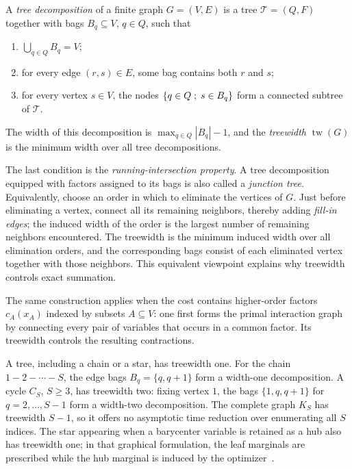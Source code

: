 \begin{defn}\label{def-treewidth}
	A \emph{tree decomposition} of a finite graph $G=(V,E)$ is a tree $\mathcal T=(Q,F)$ together with bags $B_q\subseteq V$, $q\in Q$, such that
	\begin{enumerate}
		\item $\bigcup_{q\in Q}B_q=V$;
		\item for every edge $(r,s)\in E$, some bag contains both $r$ and $s$;
		\item for every vertex $s\in V$, the nodes $\left\{ q\in Q \;;\; s\in B_q \right\}$ form a connected subtree of $\mathcal T$.
	\end{enumerate}
	The width of this decomposition is $\max_{q\in Q}|B_q|-1$, and the \emph{treewidth} $\operatorname{tw}(G)$ is the minimum width over all tree decompositions.
\end{defn}

The last condition is the \emph{running-intersection property}. A tree decomposition equipped with factors assigned to its bags is also called a \emph{junction tree}. Equivalently, choose an order in which to eliminate the vertices of $G$. Just before eliminating a vertex, connect all its remaining neighbors, thereby adding \emph{fill-in edges}; the induced width of the order is the largest number of remaining neighbors encountered. The treewidth is the minimum induced width over all elimination orders, and the corresponding bags consist of each eliminated vertex together with those neighbors. This equivalent viewpoint explains why treewidth controls exact summation.

The same construction applies when the cost contains higher-order factors $c_A(x_A)$ indexed by subsets $A\subseteq V$: one first forms the primal interaction graph by connecting every pair of variables that occurs in a common factor. Its treewidth controls the resulting contractions.

\begin{example}\label{ex-treewidth-graphs}
	A tree, including a chain or a star, has treewidth one. For the chain $1-2-\cdots-S$, the edge bags $B_q=\{q,q+1\}$ form a width-one decomposition. A cycle $C_S$, $S\geq3$, has treewidth two: fixing vertex $1$, the bags $\{1,q,q+1\}$ for $q=2,\ldots,S-1$ form a width-two decomposition. The complete graph $K_S$ has treewidth $S-1$, so it offers no asymptotic time reduction over enumerating all $S$ indices. The star appearing when a barycenter variable is retained as a hub also has treewidth one; in that graphical formulation, the leaf marginals are prescribed while the hub marginal is induced by the optimizer~\cite{FanHaaslerKarlssonChen2021GraphCostMOT}.
\end{example}

